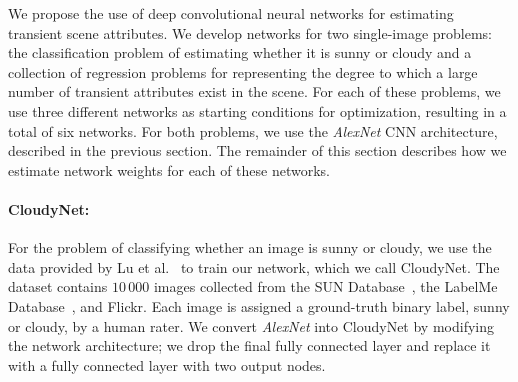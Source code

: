 \documentclass[10pt,twocolumn,letterpaper]{article}
\begin{document}
We propose the use of deep convolutional neural networks for estimating transient
scene attributes. We develop networks for two single-image problems: the
classification problem of estimating whether it is sunny or cloudy and a
collection of regression problems for representing the degree to which a large
number of transient attributes exist in the scene.  For each of these problems,
we use three different networks as starting conditions for optimization,
resulting in a total of six networks.  For both problems, we use the
\emph{AlexNet} CNN architecture, described in the previous section.  The remainder
of this section describes how we estimate network weights for each of these
networks.


\vspace{-1em}
\paragraph{CloudyNet:} For the problem of classifying whether an image is sunny or
cloudy, we use the data provided by Lu et al.~\cite{lutwoclass} to train our
network, which we call CloudyNet. 
The dataset contains $10\,000$ images collected from the SUN
Database~\cite{xiaoSUN}, the LabelMe Database~\cite{russell2008labelme}, and
Flickr. Each image is assigned a ground-truth binary label,
sunny or cloudy, by a human rater.
We convert \emph{AlexNet} into CloudyNet by modifying the network
architecture; we 
drop the final fully connected layer and replace it with a
fully connected layer with two output nodes.

\vspace{-1em}
\end{document}

